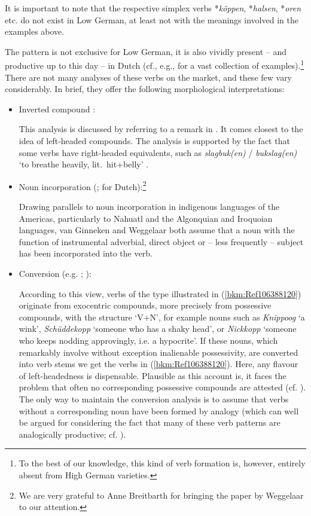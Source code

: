 \documentclass[output=paper
  ,nobabel
  ,draftmode
  ,colorlinks, citecolor=brown
]{langscibook}
\begin{document}
\noindent
It is important to note that the respective simplex verbs *\emph{köppen}, *\emph{halsen},
*\emph{oren} etc. do not exist in Low German, at least not with the meanings involved in the
examples above.

The pattern is not exclusive for Low German, it is also vividly present – and productive up to this
day – in Dutch (cf., e.g., \citealt{AsdahlHolmberg1973} for a vast collection of
examples).\footnote{To the best of our knowledge, this kind of verb formation is, however, entirely
  absent from High German varieties.} There are not many analyses of these verbs on the market, and
these few vary considerably. In brief, they offer the following morphological interpretations:


\begin{itemize}
\item Inverted compound \citep{Henzen1965}:

This analysis is discussed by \citet[55--56]{AsdahlHolmberg1973} referring to a remark in
. It comes closest to the idea of left-headed compounds. The
analysis is supported by the fact that some verbs have right-headed equivalents, such as
\emph{slagbuk(en)} / \emph{bukslag(en)} `to breathe heavily, lit.\ hit+belly' \citep[53, 56]{AsdahlHolmberg1973}.

\item Noun incorporation (\citealt{vanGinneken1939}; \citealt{Weggelaar1986} for Dutch):\footnote{We are very grateful to Anne Breitbarth for bringing the paper by Weggelaar to our attention.}

Drawing parallels to noun incorporation in indigenous languages of the Americas, particularly to Nahuatl and the Algonquian and Iroquoian languages, van Ginneken and Weggelaar both assume that a noun with the function of instrumental adverbial, direct object or – less frequently – subject has been incorporated into the verb. 

\item Conversion (e.g. \citealt{Weise1920}; \citealt{AsdahlHolmberg1973}):

According to this view, verbs of the type illustrated in (\ref{bkm:Ref106388120}) originate from exocentric compounds, more precisely from possessive compounds, with the structure `V+N', for example nouns such as \emph{Knippoog} `a wink', \emph{Schüddekopp} `someone who has a shaky head', or \emph{Nickkopp} `someone who keeps nodding approvingly, i.e. a hypocrite'. If these nouns, which remarkably involve without exception inalienable possessivity, are converted into verb stems we get the verbs in (\ref{bkm:Ref106388120}). Here, any flavour of left-headedness is dispensable. Plausible as this account is, it faces the problem that often no corresponding possessive compounds are attested (cf. \citealt[304]{Weggelaar1986}). The only way to maintain the conversion analysis is to assume that verbs without a corresponding noun have been formed by analogy (which can well be argued for considering the fact that many of these verb patterns are analogically productive; cf. \citealt{AsdahlHolmberg1973}).

\end{itemize}
\end{document}
